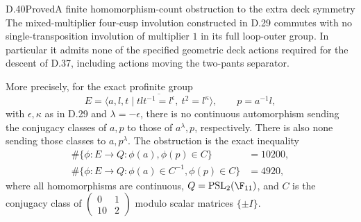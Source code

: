 \begin{claim}{D.40}{Proved}{A finite homomorphism-count obstruction to the extra deck symmetry}
The mixed-multiplier four-cusp involution constructed in D.29
commutes with no single-transposition involution of multiplier $1$ in its
full loop-outer group. In particular it admits none of the
specified geometric deck actions required for the descent of D.37,
including actions moving the two-pants separator.

More precisely, for the exact profinite group
\[
 E=\overline{\langle a,l,t\mid
       tlt^{-1}=l^\epsilon,\ t^2=l^\kappa\rangle},
 \qquad p=a^{-1}l,
                                                        \tag{D.40a}
\]
with $\epsilon,\kappa$ as in D.29 and $\lambda=-\epsilon$,
there is no continuous automorphism sending the conjugacy
classes of $a,p$ to those of $a^\lambda,p$, respectively.
There is also none sending those classes to $a,p^\lambda$.
The obstruction is the exact inequality
\[
 \begin{aligned}
 \#\{\phi:E\to Q:\phi(a),\phi(p)\in C\}&=10200,\\
 \#\{\phi:E\to Q:\phi(a)\in C^{-1},\phi(p)\in C\}&=4920,
 \end{aligned}
                                                        \tag{D.40b}
\]
where all homomorphisms are continuous,
$Q=\operatorname{PSL}_2(\F_{11})$, and $C$ is the
conjugacy class of
$\left(\begin{smallmatrix}0&1\\10&2\end{smallmatrix}\right)$
modulo scalar matrices $\{\pm I\}$.
\end{claim}
